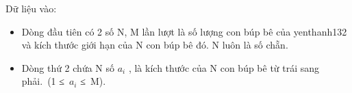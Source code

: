 Dữ liệu vào:
\begin{itemize}
	\item     Dòng đầu tiên có 2 số N, M lần lượt là số lượng con búp bê của    yenthanh132    và kích thước giới hạn của N con búp bê đó. N luôn là số chẵn.   
	\item     Dòng thứ 2 chứa N số $a_{i}$    , là kích thước của N con búp bê từ trái sang phải. (1 ≤ $a_{i}$    ≤ M).   
\end{itemize}